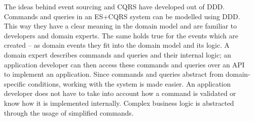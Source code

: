 The ideas behind event sourcing and CQRS have developed out of DDD. Commands and 
queries in an ES+CQRS system can be modelled using DDD.
This way they have a clear meaning in the domain model and are familiar to 
developers and domain experts. The same holds true for the events which are 
created -- as domain events they fit into the domain model and its logic.
A domain expert describes commands and queries and their internal logic;
an application developer can then access these commands and queries over an
API to implement an application. Since commands and queries abstract from 
domain-specific conditions, working with the system is made easier. 
An application developer does not have to take into account how a command is 
validated or know how it is implemented internally. Complex business logic is 
abstracted through the usage of simplified commands.
